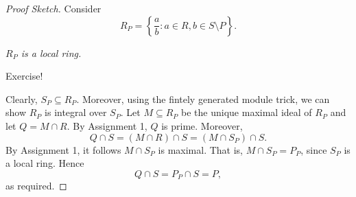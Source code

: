 \documentclass[pmath441]{subfiles}
\begin{document}
    \begin{proof}[Proof Sketch]
        Consider
        \begin{equation*}
            R_P = \left\lbrace \frac{a}{b}: a\in R, b\in S\setminus P \right\rbrace.
        \end{equation*}

        \begin{claim}
            \textit{$R_P$ is a local ring.}

            Exercise!
        \end{claim}

        Clearly, $S_P\subseteq R_P$. Moreover, using the fintely generated module trick, we can show $R_P$ is integral over $S_P$. Let $M\subseteq R_P$ be the unique maximal ideal of $R_P$ and let $Q = M\cap R$. By Assignment 1, $Q$ is prime. Moreover,
        \begin{equation*}
            Q\cap S = \left( M\cap R \right)\cap S = \left( M\cap S_P \right)\cap S.
        \end{equation*}
        By Assignment 1, it follows $M\cap S_P$ is maximal. That is, $M\cap S_P = P_P$, since $S_P$ is a local ring. Hence
        \begin{equation*}
            Q\cap S = P_P\cap S = P,
        \end{equation*}
        as required.
    \end{proof}
    
\end{document}

